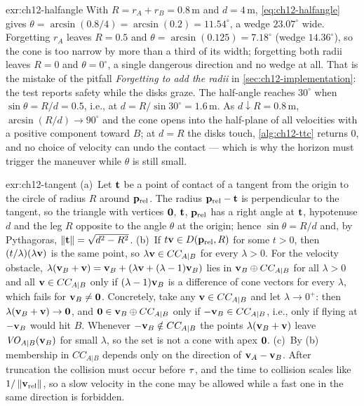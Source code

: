 \begin{solution}{exr:ch12-halfangle}
With $R=r_A+r_B=0.8\,\mathrm{m}$ and $d=4\,\mathrm{m}$, \cref{eq:ch12-halfangle}
gives $\theta=\arcsin(0.8/4)=\arcsin(0.2)=11.54^\circ$, a wedge $23.07^\circ$
wide. Forgetting $r_A$ leaves $R=0.5$ and $\theta=\arcsin(0.125)=7.18^\circ$
(wedge $14.36^\circ$), so the cone is too narrow by more than a third of its
width; forgetting both radii leaves $R=0$ and $\theta=0^\circ$, a single
dangerous direction and no wedge at all. That is the mistake of the pitfall
\emph{Forgetting to add the radii} in \cref{sec:ch12-implementation}: the test
reports safety while the disks graze. The half-angle reaches $30^\circ$ when
$\sin\theta=R/d=0.5$, i.e., at $d=R/\sin30^\circ=1.6\,\mathrm{m}$. As
$d\downarrow R=0.8\,\mathrm{m}$, $\arcsin(R/d)\to90^\circ$ and the cone opens
into the half-plane of all velocities with a positive component toward $B$;
at $d=R$ the disks touch, \cref{alg:ch12-ttc} returns $0$, and no choice of
velocity can undo the contact --- which is why the horizon must trigger the
maneuver while $\theta$ is still small.
\end{solution}
\begin{solution}{exr:ch12-tangent}
(a)~Let $\mathbf{t}$ be a point of contact of a tangent from the origin to the circle of radius $R$ around $\mathbf{p}_{\mathrm{rel}}$. The radius $\mathbf{p}_{\mathrm{rel}}-\mathbf{t}$ is perpendicular to the tangent, so the triangle with vertices $\mathbf{0}$, $\mathbf{t}$, $\mathbf{p}_{\mathrm{rel}}$ has a right angle at $\mathbf{t}$, hypotenuse $d$ and the leg $R$ opposite to the angle $\theta$ at the origin; hence $\sin\theta=R/d$ and, by Pythagoras, $\left\lVert \mathbf{t} \right\rVert=\sqrt{d^2-R^2}$. (b)~If $t\mathbf{v}\in D(\mathbf{p}_{\mathrm{rel}},R)$ for some $t>0$, then $(t/\lambda)(\lambda\mathbf{v})$ is the same point, so $\lambda\mathbf{v}\in CC_{A|B}$ for every $\lambda>0$. For the velocity obstacle, $\lambda(\mathbf{v}_B+\mathbf{v})=\mathbf{v}_B+(\lambda\mathbf{v}+(\lambda-1)\mathbf{v}_B)$ lies in $\mathbf{v}_B\oplus CC_{A|B}$ for all $\lambda>0$ and all $\mathbf{v}\in CC_{A|B}$ only if $(\lambda-1)\mathbf{v}_B$ is a difference of cone vectors for every $\lambda$, which fails for $\mathbf{v}_B\ne\mathbf{0}$. Concretely, take any $\mathbf{v}\in CC_{A|B}$ and let $\lambda\to0^+$: then $\lambda(\mathbf{v}_B+\mathbf{v})\to\mathbf{0}$, and $\mathbf{0}\in\mathbf{v}_B\oplus CC_{A|B}$ only if $-\mathbf{v}_B\in CC_{A|B}$, i.e., only if flying at $-\mathbf{v}_B$ would hit $B$. Whenever $-\mathbf{v}_B\notin CC_{A|B}$ the points $\lambda(\mathbf{v}_B+\mathbf{v})$ leave $\mathit{VO}_{A|B}(\mathbf{v}_B)$ for small $\lambda$, so the set is not a cone with apex $\mathbf{0}$. (c)~By (b) membership in $CC_{A|B}$ depends only on the direction of $\mathbf{v}_A-\mathbf{v}_B$. After truncation the collision must occur before $\tau$, and the time to collision scales like $1/\left\lVert \mathbf{v}_{\mathrm{rel}} \right\rVert$, so a slow velocity in the cone may be allowed while a fast one in the same direction is forbidden.
\end{solution}
